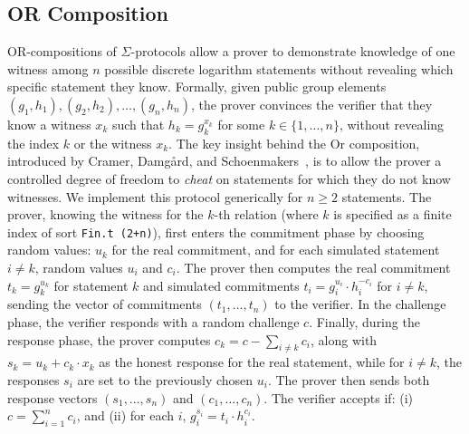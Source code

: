 \documentclass[sigconf, anonymous]{acmart}
\begin{document}
\subsection{OR Composition}
OR-compositions of $\Sigma$-protocols allow a prover to demonstrate knowledge of one witness among $n$ possible discrete logarithm statements 
without revealing which specific statement they know. Formally, given public group elements $(g_1, h_1), (g_2, h_2), \ldots, (g_n, h_n)$, 
the prover convinces the verifier that they know a witness $x_k$ such that $h_k = g_k^{x_k}$ for some $k \in \{1, \ldots, n\}$, 
without revealing the index $k$ or the witness $x_k$. The key insight behind the Or composition, introduced by Cramer, Damg\aa rd, and Schoenmakers~\cite{cramer1994proofs}, 
is to allow the prover a controlled degree of freedom to \emph{cheat} on statements for which they do not know witnesses.  We implement this protocol generically for $n \geq 2$ statements. The prover, knowing the witness for the $k$-th relation (where $k$ is specified as a finite index of sort \texttt{Fin.t (2+n)}), first enters the commitment phase by choosing random values: $u_k$ for the real commitment, and for each simulated statement $i \neq k$, random values $u_i$ and $c_i$. The prover then computes the real commitment $t_k = g_k^{u_k}$ for statement $k$ and simulated commitments $t_i = g_i^{u_i} \cdot h_i^{-c_i}$ for $i \neq k$, sending the vector of commitments $(t_1, \ldots, t_n)$ to the verifier. In the challenge phase, the verifier responds with a random challenge $c$. Finally, during the response phase, the prover computes $c_k = c - \sum_{i \neq k} c_i$, along with $s_k = u_k + c_k \cdot x_k$ as the honest response for the real statement, while for $i \neq k$, the responses $s_i$ are set to the previously chosen $u_i$. The prover then sends both response vectors $(s_1, \ldots, s_n)$ and $(c_1, \ldots, c_n)$. The verifier accepts if: (i) $c = \sum_{i=1}^{n} c_i$, and (ii) for each $i$, $g_i^{s_i} = t_i \cdot h_i^{c_i}$.
\end{document}
